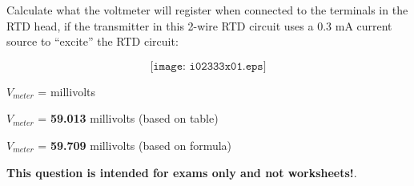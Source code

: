 

Calculate what the voltmeter will register when connected to the terminals in the RTD head, if the transmitter in this 2-wire RTD circuit uses a 0.3 mA current source to ``excite'' the RTD circuit:

$$\texttt{[image: i02333x01.eps]}$$

$V_{meter}$ = \underbar{\hskip 50pt} millivolts







$V_{meter}$ = {\bf 59.013} millivolts (based on table)

\vskip 10pt

$V_{meter}$ = {\bf 59.709} millivolts (based on formula)







{\bf This question is intended for exams only and not worksheets!}.


